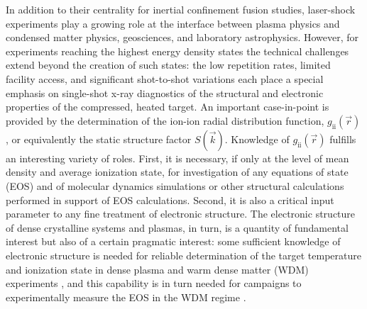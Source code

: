 In addition to their centrality for inertial confinement fusion
studies, \cite{LINDL2004PHYSICS,MOSES2009IGNITION}
laser-shock experiments play a growing role at the interface between
plasma physics and condensed matter physics, geosciences, and laboratory
astrophysics. \cite{LANGENHORST1999LASER, GATTACCECA2010UNRAVELING, TAKABE2008HIGH, SILVA2004PROTON, REMINGTON2000REVIEW, PARK2012STUDYING, KOENIG2006RADIATIVE, MACCHI2013ION, GREGORI2012GENERATION, FIUZA2012WEIBEL, DOLLAR2013SCALING, AKLI2008LASER}
However, for experiments reaching the highest energy density states the
technical challenges extend beyond the creation of such states: the low
repetition rates, limited facility access, and significant shot-to-shot
variations each place a special emphasis on single-shot x-ray
diagnostics of the structural and electronic properties of the
compressed, heated
target. \cite{YOUNG1998HIGH, OADES2004TARGET, WORKMAN2001X, STOECKL2001HARD, LANDEN2001X, HUDSON2002HIGH, DEWALD2004DANTE}
An important case-in-point is provided by the determination of the
ion-ion radial distribution function,
\(g_{\text{ii}}\left( \overrightarrow{r} \right)\), or equivalently the
static structure factor \(S(\overrightarrow{k})\). Knowledge of
\(g_{\text{ii}}\left( \overrightarrow{r} \right)\) fulfills an
interesting variety of roles. First, it is necessary, if only at the
level of mean density and average ionization state, for investigation of
any equations of state (EOS) and of molecular dynamics simulations or
other structural calculations performed in support of EOS calculations.
Second, it is also a critical input parameter to any fine treatment of
electronic structure. The electronic structure of dense crystalline
systems and plasmas, in turn, is a quantity of fundamental interest but
also of a certain pragmatic interest: some sufficient knowledge of
electronic structure is needed for reliable determination of the target
temperature and ionization state in dense plasma and warm dense matter
(WDM) experiments
 \cite{glenzer2009x, GREGORI2004ELECTRONIC}{},
and this capability is in turn needed for campaigns to experimentally
measure the EOS in the WDM regime
 \cite{lee2009x, FORTMANN2012MEASUREMENT, mattern2013condensed}.

